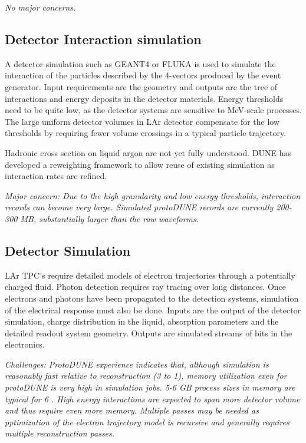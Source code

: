 \documentclass[../main-v1.tex]{subfiles}
\begin{document}
{\it No major concerns.}

\subsection{Detector Interaction simulation}
A detector simulation such as GEANT4\cite{Allison:2016lfl} or FLUKA\cite{Bohlen:2014buj} is used to simulate the interaction of the particles described by the 4-vectors produced by the event generator. Input requirements are the geometry and outputs are the tree of interactions and energy deposits in the detector materials. 
Energy thresholds need to be quite low, as the detector systems are sensitive to MeV-scale processes. The large uniform detector volumes in LAr detector compensate for the low thresholds by requiring fewer volume crossings in a typical particle trajectory.  

Hadronic cross section on liquid argon are not yet fully understood.  DUNE has developed a reweighting framework 
\cite{Calcutt:2021zck} to allow reuse of existing simulation as interaction rates are refined.

{\it Major concern: Due to the high granularity and low energy thresholds, interaction records can become very large. Simulated protoDUNE records are currently 200-300 MB, substantially larger than the raw waveforms.}

\subsection{Detector Simulation}
LAr TPC's require detailed models of electron trajectories through a potentially charged fluid.  Photon detection requires ray tracing over long distances.  Once electrons and photons have been propagated to the detection systems, simulation of the electrical response must also be done. Inputs are the output of the detector simulation, charge distribution in the liquid, absorption parameters and the detailed readout system geometry. Outputs are simulated streams of bits in the electronics. 

{\it Challenges:  ProtoDUNE experience indicates that, although simulation is reasonably fast relative to reconstruction (3 to 1), memory utilization even for protoDUNE is very high in simulation jobs.  5-6 GB process sizes in memory are typical for 6 .  High energy  interactions are expected to span more detector volume and thus require even more memory. Multiple passes may be needed as pptimization of the electron trajectory model is recursive and generally requires multiple reconstruction passes. }
\end{document}
